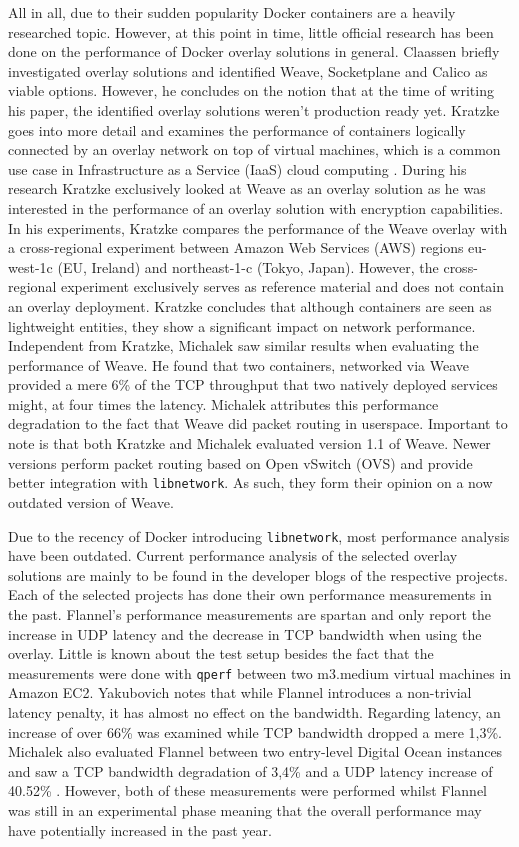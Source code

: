 All in all, due to their sudden popularity Docker containers are a heavily researched topic. However, at this point in time, little official research has been done on the performance of Docker overlay solutions in general. Claassen briefly investigated overlay solutions and identified Weave, Socketplane and Calico as viable options. However, he concludes on the notion that at the time of writing his paper, the identified overlay solutions weren't production ready yet. Kratzke goes into more detail and examines the performance of containers logically connected by an overlay network on top of virtual machines, which is a common use case in Infrastructure as a Service (IaaS) cloud computing \cite{Kra2015b}. During his research Kratzke exclusively looked at Weave as an overlay solution as he was interested in the performance of an overlay solution with encryption capabilities. In his experiments, Kratzke compares the performance of the Weave overlay with a cross-regional experiment between Amazon Web Services (AWS) regions eu-west-1c (EU, Ireland) and northeast-1-c (Tokyo, Japan). However, the cross-regional experiment exclusively serves as reference material and does not contain an overlay deployment. Kratzke concludes that although containers are seen as lightweight entities, they show a significant impact on network performance. Independent from Kratzke, Michalek saw similar results \cite{lauriemichalek2015} when evaluating the performance of Weave. He found that two containers, networked via Weave provided a mere 6\% of the TCP throughput that two natively deployed services might, at four times the latency. Michalek attributes this performance degradation to the fact that Weave did packet routing in userspace. Important to note is that both Kratzke and Michalek evaluated version 1.1 of Weave. Newer versions perform packet routing based on Open vSwitch (OVS) and provide better integration with \texttt{libnetwork}. As such, they form their opinion on a now outdated version of Weave. 

Due to the recency of Docker introducing \texttt{libnetwork}, most performance analysis have been outdated. Current performance analysis of the selected overlay solutions are mainly to be found in the developer blogs of the respective projects. Each of the selected projects has done their own performance measurements in the past. Flannel's performance measurements are spartan and only report the increase in UDP latency and the decrease in TCP bandwidth when using the overlay. Little is known about the test setup besides the fact that the measurements were done with \texttt{qperf} between two m3.medium virtual machines in Amazon EC2. Yakubovich \cite{1_yakubovich_2014} notes that while Flannel introduces a non-trivial latency penalty, it has almost no effect on the bandwidth. Regarding latency, an increase of over 66\% was examined while TCP bandwidth dropped a mere 1,3\%. Michalek also evaluated Flannel between two entry-level Digital Ocean instances and saw a TCP bandwidth degradation of 3,4\% and a UDP latency increase of 40.52\% \cite{lauriemichalek2015}. However, both of these measurements were performed whilst Flannel was still in an experimental phase meaning that the overall performance may have potentially increased in the past year.


